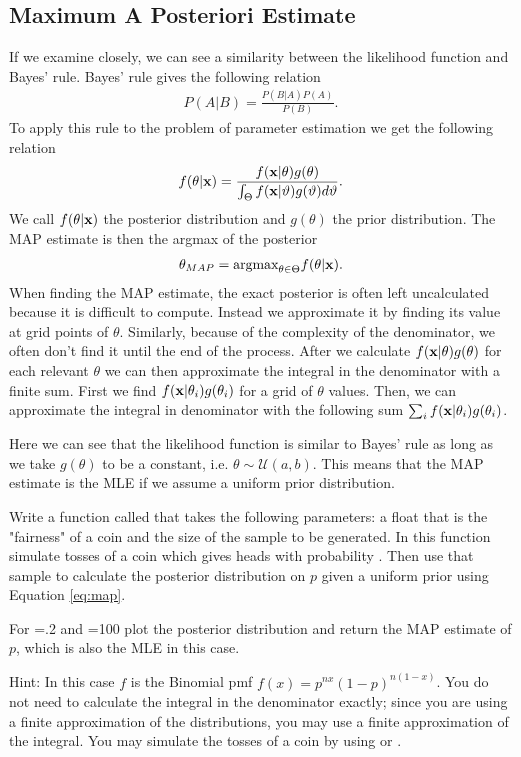 \subsection*{Maximum A Posteriori Estimate}
If we examine closely, we can see a similarity between the likelihood function and Bayes' rule.
Bayes' rule gives the following relation
\begin{align*}
  P(A| B) = \frac{P(B | A)P(A)}{P(B)}.
\end{align*}
To apply this rule to the problem of parameter estimation we get the following relation
\begin{align}\label{eq:cont_bayes}
  f(\theta | \mathbf{x}) = \frac{f(\mathbf{x} | \theta)g(\theta)}{\int_{\Theta}f(\mathbf{x} | \vartheta)g(\vartheta) d\vartheta}.
\end{align}
We call $f(\theta | \mathbf{x})$ the posterior distribution and $g(\theta)$ the prior distribution.
The MAP estimate is then the argmax of the posterior
\begin{align}\label{eq:map}
  \theta_{MAP} = \mbox{argmax}_{\theta\in\Theta} f(\theta| \mathbf{x}).
\end{align}
When finding the MAP estimate, the exact posterior is often left uncalculated because it is difficult to compute.
Instead we approximate it by finding its value at grid points of $\theta$.
Similarly, because of the complexity of the denominator, we often don't find it until the end of the process.
After we calculate $f(\mathbf{x} | \theta)g(\theta)$ for each relevant $\theta$ we can then approximate the integral in the denominator with a finite sum.
First we find $f(\mathbf{x} | \theta_i)g(\theta_i)$ for a grid of $\theta$ values.
Then, we can approximate the integral in denominator with the following sum $\sum_i f(\mathbf{x} | \theta_i)g(\theta_i)$.

Here we can see that the likelihood function is similar to Bayes' rule as long as we take $g(\theta)$ to be a constant, i.e. $\theta\sim \mathcal{U}(a,b)$.
This means that the MAP estimate is the MLE if we assume a uniform prior distribution.

\begin{problem}\label{prob:unif}
  Write a function called  that takes the following parameters:  a float that is the "fairness" of a coin and  the size of the sample to be generated.
  In this function simulate  tosses of a coin which gives heads with probability .
  Then use that sample to calculate the posterior distribution on $p$ given a uniform prior using Equation \ref{eq:map}.

  For =.2 and =100 plot the posterior distribution and return the MAP estimate of $p$, which is also the MLE in this case.

  Hint: In this case $f$ is the Binomial pmf $f(x) = p^{nx}(1-p)^{n(1-x)}$. You do not need to calculate the integral in the denominator exactly; since you are using a finite approximation of the distributions, you may use a finite approximation of the integral.
  You may simulate the tosses of a coin by using  or .
\end{problem}

